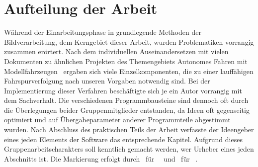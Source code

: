 \section{Aufteilung der Arbeit \dcsecondauthorshort}
Während der Einarbeitungsphase in grundlegende Methoden der Bildverarbeitung, dem Kerngebiet dieser Arbeit, wurden Problematiken vorrangig zusammen erörtert. Nach dem individuellen Auseinandersetzen mit vielen Dokumenten zu ähnlichen Projekten des Themengebiets \glqq Autonomes Fahren mit Modellfahrzeugen \grqq\ ergaben sich viele Einzelkomponenten, die zu einer lauffähigen Fahrspurverfolgung nach unseren Vorgaben notwendig sind. Bei der Implementierung dieser Verfahren beschäftigte sich je ein Autor vorrangig mit dem Sachverhalt. Die verschiedenen Programmbausteine sind dennoch oft durch die Überlegungen beider Gruppenmitglieder entstanden, da Ideen oft gegenseitig optimiert und auf Übergabeparameter anderer Programmteile abgestimmt wurden. Nach Abschluss des praktischen Teils der Arbeit verfasste der Ideengeber eines jeden Elements der Software das entsprechende Kapitel.   
Aufgrund dieses Gruppenarbeitscharakters soll kenntlich gemacht werden, wer Urheber eines jeden Abschnitts ist. Die Markierung erfolgt durch \dcfirstauthorshort\ für \dcfirstauthorfirstname\ \dcfirstauthorlastname\  und \dcsecondauthorshort\  für \dcsecondauthorfirstname\ \dcsecondauthorlastname{}.


